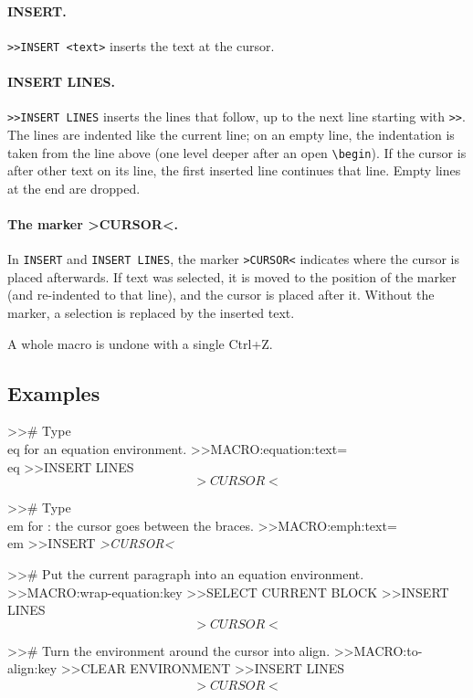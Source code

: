 \documentclass[11pt]{article}
\newcommand{\key}[1]{\textsf{#1}}
\newcommand{\gt}{\textgreater}
\begin{document}
    \paragraph{INSERT.}
    \verb+>>INSERT <text>+ inserts the text at the cursor.

    \paragraph{INSERT LINES.}
    \verb+>>INSERT LINES+ inserts the lines that follow, up to the next line starting with \verb+>>+. The lines are indented like the current line; on an empty line, the indentation is taken from the line above (one level deeper after an open \verb+\begin+). If the cursor is after other text on its line, the first inserted line continues that line. Empty lines at the end are dropped.

    \paragraph{The marker \gt CURSOR\textless.}
    In \verb+INSERT+ and \verb+INSERT LINES+, the marker \verb+>CURSOR<+ indicates where the cursor is placed afterwards. If text was selected, it is moved to the position of the marker (and re-indented to that line), and the cursor is placed after it. Without the marker, a selection is replaced by the inserted text.

    A whole macro is undone with a single \key{Ctrl+Z}.

    \subsection{Examples}

    \begin{Code}
>># Type \\eq for an equation environment.
>>MACRO:equation:text=\\eq
>>INSERT LINES
\begin{equation}
    >CURSOR<
\end{equation}

>># Type \\em for \emph{}: the cursor goes between the braces.
>>MACRO:emph:text=\\em
>>INSERT \emph{>CURSOR<}

>># Put the current paragraph into an equation environment.
>>MACRO:wrap-equation:key
>>SELECT CURRENT BLOCK
>>INSERT LINES
\begin{equation}
    >CURSOR<
\end{equation}

>># Turn the environment around the cursor into align.
>>MACRO:to-align:key
>>CLEAR ENVIRONMENT
>>INSERT LINES
\begin{align}
    >CURSOR<
\end{align}
    \end{Code}
\end{document}
